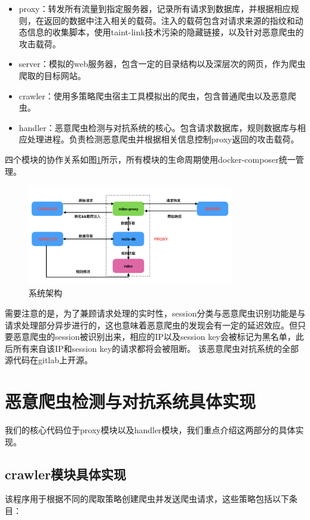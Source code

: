 \documentclass[doctor,privacy,twoside]{buaa_mac}
\begin{document}
\begin{itemize}
\item[1）] proxy：转发所有流量到指定服务器，记录所有请求到数据库，并根据相应规则，在返回的数据中注入相关的载荷。注入的载荷包含对请求来源的指纹和动态信息的收集脚本，使用taint-link技术污染的隐藏链接，以及针对恶意爬虫的攻击载荷。
\item[2）] server：模拟的web服务器，包含一定的目录结构以及深层次的网页，作为爬虫爬取的目标网站。
\item[3）] crawler：使用多策略爬虫宿主工具模拟出的爬虫，包含普通爬虫以及恶意爬虫。
\item[4）] handler：恶意爬虫检测与对抗系统的核心。包含请求数据库，规则数据库与相应处理进程。负责检测恶意爬虫并根据相关信息控制proxy返回的攻击载荷。
\end{itemize}

四个模块的协作关系如图\ref{fig:architecture}所示，所有模块的生命周期使用docker-composer统一管理。

\begin{figure}[!h]
  \centering
  \includegraphics[width=0.8\textwidth]{images/architecture/architecture001.jpeg}
  \caption{系统架构}
  \label{fig:architecture}
\end{figure}


需要注意的是，为了兼顾请求处理的实时性，session分类与恶意爬虫识别功能是与请求处理部分异步进行的，这也意味着恶意爬虫的发现会有一定的延迟效应。但只要恶意爬虫的session被识别出来，相应的IP以及session key会被标记为黑名单，此后所有来自该IP和session key的请求都将会被阻断。
该恶意爬虫对抗系统的全部源代码在gitlab上开源。



\section{恶意爬虫检测与对抗系统具体实现}
我们的核心代码位于proxy模块以及handler模块，我们重点介绍这两部分的具体实现。

\subsection{crawler模块具体实现}
该程序用于根据不同的爬取策略创建爬虫并发送爬虫请求，这些策略包括以下条目：
\end{document}
